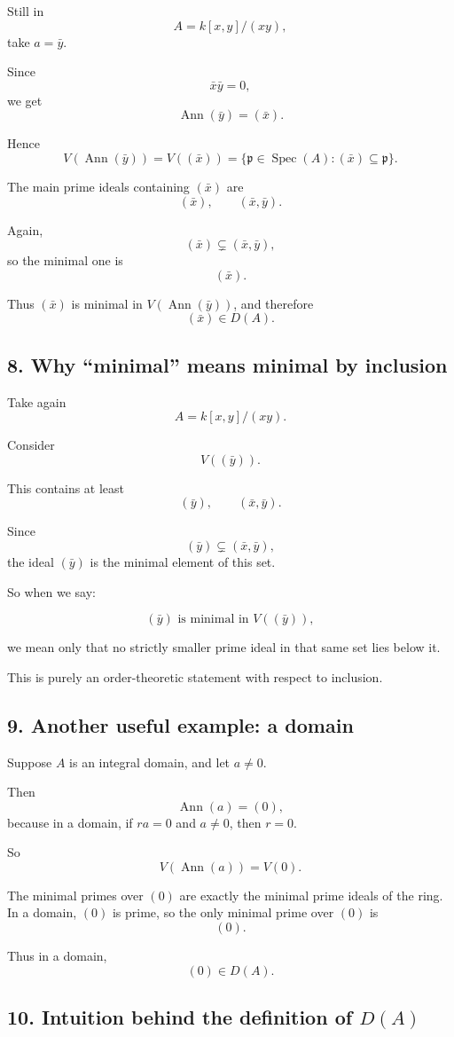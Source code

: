 \documentclass[12pt,a4paper]{article}
\theoremstyle{notespace}
\DeclareMathOperator{\Spec}{Spec}
\DeclareMathOperator{\Ann}{Ann}
\begin{document}
Still in
\[
A=k[x,y]/(xy),
\]
take \(a=\bar y\).

Since
\[
\bar x\bar y=0,
\]
we get
\[
\Ann(\bar y)=(\bar x).
\]

Hence
\[
V(\Ann(\bar y))=V((\bar x))
=\{\mathfrak p\in \Spec(A): (\bar x)\subseteq \mathfrak p\}.
\]

The main prime ideals containing \((\bar x)\) are
\[
(\bar x), \qquad (\bar x,\bar y).
\]

Again,
\[
(\bar x)\subsetneq (\bar x,\bar y),
\]
so the minimal one is
\[
(\bar x).
\]

Thus \((\bar x)\) is minimal in \(V(\Ann(\bar y))\), and therefore
\[
(\bar x)\in D(A).
\]

\subsection{8. Why ``minimal'' means minimal by inclusion}

Take again
\[
A=k[x,y]/(xy).
\]

Consider
\[
V((\bar y)).
\]

This contains at least
\[
(\bar y), \qquad (\bar x,\bar y).
\]

Since
\[
(\bar y)\subsetneq (\bar x,\bar y),
\]
the ideal \((\bar y)\) is the minimal element of this set.

So when we say:

\[
(\bar y)\text{ is minimal in }V((\bar y)),
\]

we mean only that no strictly smaller prime ideal in that same set lies below it.

This is purely an order-theoretic statement with respect to inclusion.

\subsection{9. Another useful example: a domain}

Suppose \(A\) is an integral domain, and let \(a\neq 0\).

Then
\[
\Ann(a)=(0),
\]
because in a domain, if \(ra=0\) and \(a\neq 0\), then \(r=0\).

So
\[
V(\Ann(a))=V(0).
\]

The minimal primes over \((0)\) are exactly the minimal prime ideals of the ring. In a domain, \((0)\) is prime, so the only minimal prime over \((0)\) is
\[
(0).
\]

Thus in a domain,
\[
(0)\in D(A).
\]

\subsection{10. Intuition behind the definition of \(D(A)\)}
\end{document}
